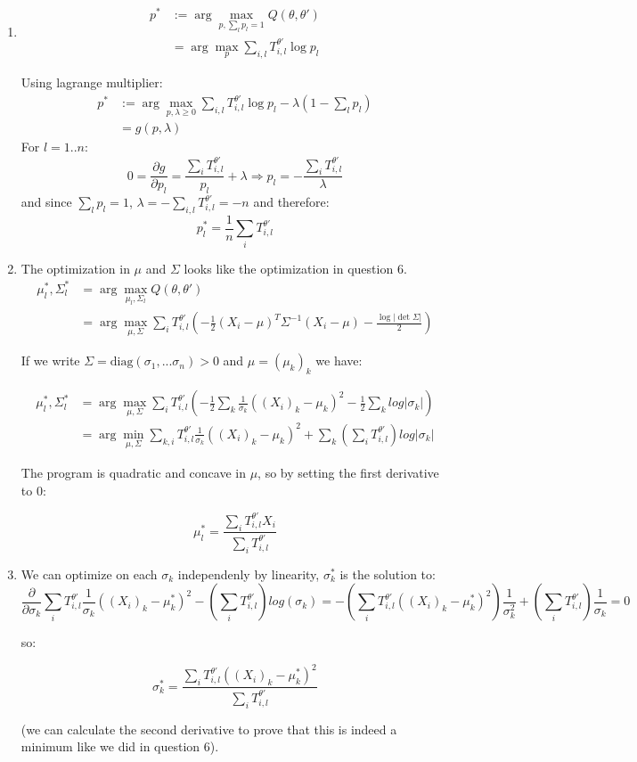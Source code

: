 \documentclass[12pt]{article}
\begin{document}
\begin{enumerate}

\item
\begin{align}
p^* &:= \arg\max_{p, \sum_l p_l = 1} Q(\theta, \theta')
\\ &=  \arg\max_{p} \sum_{i,l} T^{\theta'}_{i,l}  \log p_l
\end{align}

Using lagrange multiplier:
\begin{align}
p^* &:= \arg\max_{p, \lambda \geq 0} \sum_{i,l} T^{\theta'}_{i,l}  \log p_l - \lambda (1 - \sum_l p_l)
\\&= g(p, \lambda)
\end{align}
For $l = 1.. n$:
$$ 0 = \frac{\partial g}{\partial p_l} = \frac{\sum_i T^{\theta'}_{i,l}}{p_l} + \lambda \Rightarrow p_l = - \frac{\sum_i T^{\theta'}_{i,l}}{\lambda}$$
and since $\sum_l p_l = 1$, $\lambda = -\sum_{i,l} T^{\theta'}_{i,l} = -n$ and therefore:
$$p_l^{*} = \frac1 n \sum_i T^{\theta'}_{i,l}$$

\item

The optimization in $\mu$ and $\Sigma$ looks like the optimization in question $6$.
\begin{align}
\mu_l^*, \Sigma_l^* &= \arg\max_{\mu_l, \Sigma_l} Q(\theta, \theta')
\\&=\arg\max_{\mu, \Sigma} \sum_{i} T^{\theta'}_{i,l} ( -\frac12 (X_i - \mu)^T \Sigma^{-1}(X_i - \mu) - \frac{\log|\det \Sigma|}2)
\end{align}


If we write $\Sigma = \text{diag}(\sigma_1, ... \sigma_n) > 0$  and $\mu = (\mu_k)_k$ we have:

\begin{align}
\mu_l^*, \Sigma_l^* 
&=\arg\max_{\mu, \Sigma} \sum_{i} T^{\theta'}_{i,l} \left( -\frac12 \sum_k \frac{1}{\sigma_k}((X_i)_k - \mu_k)^2  - \frac12 \sum_k log|\sigma_k|\right)
\\&=\arg\min_{\mu, \Sigma} \sum_{k, i} T^{\theta'}_{i,l} \frac{1}{\sigma_k}((X_i)_k - \mu_k)^2  +  \sum_k (\sum_i T^{\theta'}_{i,l}) log|\sigma_k|
\end{align}

The program is quadratic and concave in $\mu$, so by setting the first derivative to 0:

$$\mu_l^* = \frac{\sum_i T^{\theta'}_{i,l} X_i}{\sum_i T^{\theta'}_{i,l}}$$


\item
We can optimize on each $\sigma_k$ independenly by linearity, $\sigma_k^*$ is the solution to:
$$\frac{\partial}{\partial \sigma_k} \sum_{i} T^{\theta'}_{i,l} \frac{1}{\sigma_k}((X_i)_k - \mu_k^*)^2  -  (\sum_i T^{\theta'}_{i,l}) log(\sigma_k) =
 - (\sum_{i} T^{\theta'}_{i,l} ((X_i)_k - \mu_k^*)^2) \frac{1}{\sigma_k^2}  +  (\sum_i T^{\theta'}_{i,l}) \frac{1}{\sigma_k}
 = 0$$

so:

$$\sigma_k^* = \frac{\sum_{i} T^{\theta'}_{i,l} ((X_i)_k - \mu_k^*)^2}{\sum_i T^{\theta'}_{i,l}}$$

(we can calculate the second derivative to prove that this is indeed a minimum like we did in question 6).
\end{enumerate}
\end{document}
